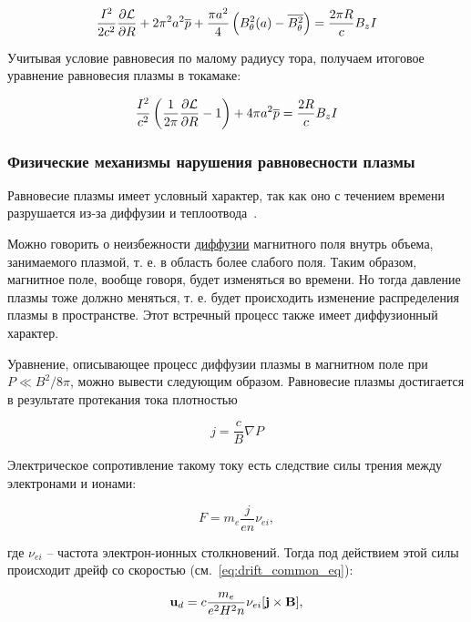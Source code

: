 \documentclass[10pt, a4paper]{article}
\begin{document}
\begin{equation*}
   \frac{I^2}{2c^2} \pdv{\mathcal{L}}{R} + 2\pi^2 a^2 \overline{p} + \frac{\pi a^2}{4}\left( B_\theta^2(a) - \overline{B_\theta^2} \right) = \frac{2\pi R}{c} B_z I
\end{equation*}

Учитывая условие равновесия по малому радиусу тора, получаем итоговое уравнение равновесия плазмы в токамаке:

\begin{equation*}
   \frac{I^2}{c^2} \left( \frac{1}{2\pi}\pdv{\mathcal{L}}{R} - 1 \right) + 4\pi a^2 \overline{p} = \frac{2 R}{c} B_z I
\end{equation*}

\subsubsection{Физические механизмы нарушения равновесности плазмы}

Равновесие плазмы имеет условный
характер, так как оно с течением времени разрушается из-за диффузии и теплоотвода~\cite{arzimovich}.

Можно говорить о неизбежности \uline{диффузии} магнитного поля
внутрь объема, занимаемого плазмой, т. е. в область более слабого
поля. Таким образом, магнитное поле, вообще говоря, будет изменяться во времени. Но тогда давление плазмы тоже должно меняться, т. е. будет происходить изменение распределения
плазмы в пространстве. Этот встречный процесс также имеет диффузионный характер.

Уравнение, описывающее процесс диффузии плазмы в магнитном поле при $P\ll B^2/8\pi$, можно вывести следующим образом. Равновесие плазмы достигается в результате протекания тока плотностью

\begin{equation*}
	j = \frac{c}{B}\nabla P
\end{equation*}

Электрическое сопротивление
такому току есть следствие силы трения между электронами и ионами:

\begin{equation*}
	F = m_e\frac{j}{en}\nu_{ei},
\end{equation*}

где $\nu_{ei}$ -- частота электрон-ионных столкновений. Тогда под действием этой силы происходит дрейф со скоростью (см.~\eqref{eq:drift_common_eq}):

\begin{equation} \label{eq:magnetic_drift}
	\vb{u}_d = c \frac{m_e}{e^2H^2n}\nu_{ei}[\vb{j}\times\vb{B}],
\end{equation}
\end{document}
